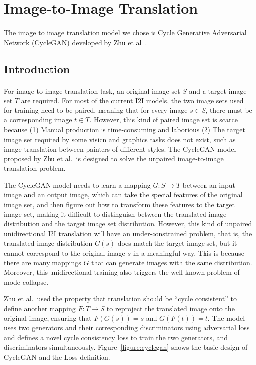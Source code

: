 \section{Image-to-Image Translation}
\paragraph{}
The image to image translation model we chose is Cycle Generative Adversarial Network (CycleGAN) developed by Zhu et al~\cite{zhu2017unpaired}.

\subsection{Introduction}
\paragraph{}
For image-to-image translation task, an original image set $S$ and a target image set $T$ are required. For most of the current I2I models, the two image sets used for training need to be paired, meaning that for every image $s \in S$, there must be a corresponding image $t \in T$. However, this kind of paired image set is scarce because (1) Manual production is time-consuming and laborious (2) The target image set required by some vision and graphics tasks does not exist, such as image translation between painters of different styles. The CycleGAN model proposed by Zhu et al.\ is designed to solve the unpaired image-to-image translation problem. 

The CycleGAN model needs to learn a mapping $G: S \rightarrow T$ between an input image and an output image, which can take the special features of the original image set, and then figure out how to transform these features to the target image set, making it difficult to distinguish between the translated image distribution and the target image set distribution. However, this kind of unpaired unidirectional I2I translation will have an under-constrained problem, that is, the translated image distribution $G(s)$ does match the target image set, but it cannot correspond to the original image $s$ in a meaningful way. This is because there are many mappings $G$ that can generate images with the same distribution. Moreover, this unidirectional training also triggers the well-known problem of mode collapse.

Zhu et al.\ used the property that translation should be ``cycle consistent'' to define another mapping $F: T \rightarrow S$ to reproject the translated image onto the original image, ensuring that $F(G(s))=s$ and $G(F(t))=t$. The model uses two generators and their corresponding discriminators using adversarial loss and defines a novel cycle consistency loss to train the two generators, and discriminators simultaneously. Figure~\ref{figure:cyclegan} shows the basic design of CycleGAN and the Loss definition.


